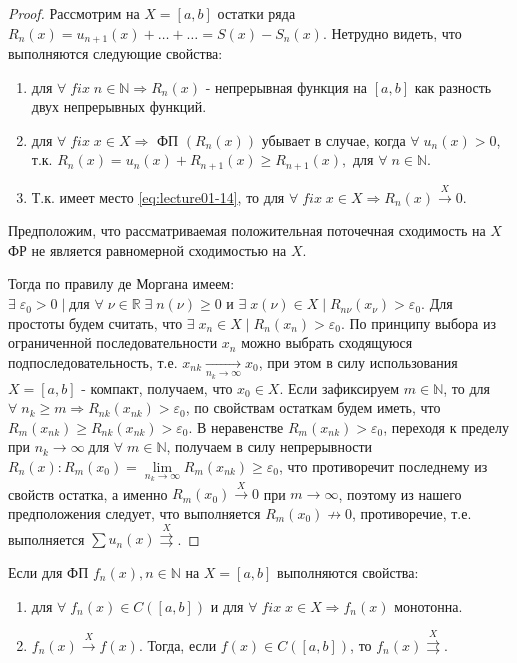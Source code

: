 \begin{proof}
	Рассмотрим на $X = [a,b]$ остатки ряда $R_n(x) = u_{n+1}(x) + \ldots + \ldots = S(x) - S_n(x)$.	Нетрудно видеть, что выполняются следующие свойства:
	\begin{enumerate}
		\item для $\forall \; fix \; n \in \mathbb{N} \Rightarrow R_n (x)$ - непрерывная функция на $[a,b]$ как разность двух непрерывных функций.
		\item для $\forall \; fix \; x \in X \Rightarrow$ $\text{ФП}$ $(R_n(x))$ убывает в случае, когда $\forall \; u_n (x) > 0$, т.к. \newline $R_n(x) = u_n(x) + R_{n+1}(x) \geqslant R_{n+1}(x), \text{ для } \forall \; n \in \mathbb{N}$.
		\item Т.к. имеет место \eqref{eq:lecture01-14}, то для $\forall \; fix \; x \in X \Rightarrow R_n(x) \overset{X}{\to} 0$.
	\end{enumerate}
	Предположим, что рассматриваемая положительная поточечная сходимость на $X$ ФР не является равномерной сходимостью на $X$.

	Тогда по правилу де Моргана имеем: $\exists \; \varepsilon_0 > 0 \; | \; \text{для } \forall \; \nu \in \mathbb{R} \; \exists \; n (\nu) \geqslant 0 \text{ и } \exists \; x (\nu) \in X \; | \; R_{n \nu} (x_\nu) > \varepsilon_0$. Для простоты будем считать, что $\exists \; x_n \in X \; | \; R_n (x_n) > \varepsilon_0$. По принципу выбора из ограниченной последовательности $x_n$ можно выбрать сходящуюся подпоследовательность, т.е. $x_{nk} \underset{n_k \to \infty}{\longrightarrow} x_0$, при этом в силу использования $X = [a,b]$ - компакт, получаем, что $x_0 \in X$. Если зафиксируем $m \in \mathbb{N}$, то для $\forall \; n_k \geqslant m \Rightarrow R_{nk} 	(x_{nk}) > \varepsilon_0$, по свойствам остаткам будем иметь, что $R_{m} (x_{nk}) \geqslant R_{nk} (x_{nk}) > \varepsilon_0$. В неравенстве $R_m (x_{nk}) > \varepsilon_0$, переходя к пределу при $n_k \to \infty \; \text{для } \forall \; m \in \mathbb{N}$, получаем в силу непрерывности $R_n(x): R_m (x_0) = \lim\limits_{n_k \to \infty} R_m(x_{nk}) \geqslant \varepsilon_0$, что противоречит последнему из свойств остатка, а именно $R_m(x_0) \overset{X}{\longrightarrow} 0$ при $m \to \infty$, поэтому из нашего предположения следует, что выполняется $R_m(x_0) \not\to 0$, противоречие, т.е. выполняется $\sum u_n(x) \overset{X}{\rightrightarrows}$.
\end{proof}
\begin{consequence}
	Если для ФП $f_n(x), n \in \mathbb{N}$ на $X = [a,b]$ выполняются свойства:
	\begin{enumerate}
		\item для $\forall \; f_n(x) \in C([a,b])$ и для	 $\forall \; fix \; x \in X \Rightarrow f_n(x)$ монотонна.
		\item $f_n(x) 	\overset{X}{\longrightarrow}f(x)$. Тогда, если $f(x) \in C([a,b])$, то $f_n(x) \overset{X}{\rightrightarrows}$.
	\end{enumerate}
\end{consequence}
